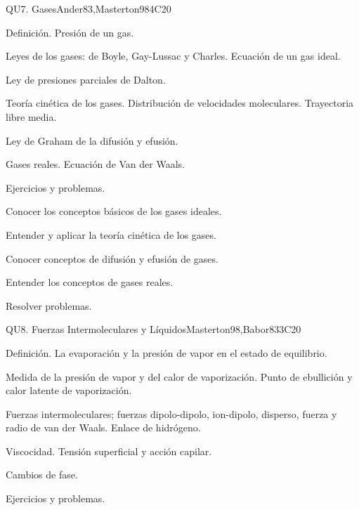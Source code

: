 \begin{syllabus}
\begin{unit}{QU7. Gases}{}{Ander83,Masterton98}{4}{C20}
\begin{topics}
      \item Definición. Presión de un gas.
      \item Leyes de los gases: de Boyle, Gay-Lussac y Charles. Ecuación de un gas ideal.
      \item Ley de presiones parciales de Dalton.
      \item Teoría cinética de los gases. Distribución de velocidades moleculares. Trayectoria libre media.
      \item Ley de Graham de la difusión y efusión.
      \item Gases reales. Ecuación de Van der Waals.
      \item Ejercicios y problemas.
   \end{topics}

   \begin{learningoutcomes}
      \item Conocer los conceptos básicos de los gases ideales.
      \item Entender y aplicar la teoría cinética de los gases.
      \item Conocer conceptos de difusión y efusión de gases.
      \item Entender los conceptos de gases reales.
      \item Resolver problemas.
   \end{learningoutcomes}
\end{unit}

\begin{unit}{QU8. Fuerzas Intermoleculares y Líquidos}{}{Masterton98,Babor83}{3}{C20}
\begin{topics}
      \item Definición. La evaporación y la presión de vapor en el estado de equilibrio.
      \item Medida de la presión de vapor y del calor de vaporización. Punto de ebullición y calor latente de vaporización.
      \item Fuerzas intermoleculares; fuerzas dipolo-dipolo, ion-dipolo, disperso, fuerza y radio de van der Waals. Enlace de hidrógeno.
      \item Viscocidad. Tensión superficial y acción capilar.
      \item Cambios de fase.
      \item Ejercicios y problemas.
    \end{topics}


\end{unit}
\end{syllabus}

